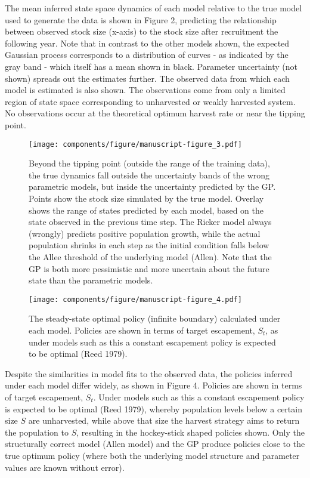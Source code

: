 \documentclass[author-year, 12pt,review]{elsarticle} %
\makeatletter
\def\maxwidth{\ifdim\Gin@nat@width>\linewidth\linewidth
\else\Gin@nat@width\fi}
\let\Oldincludegraphics\includegraphics
\renewcommand{\includegraphics}[1]{\Oldincludegraphics[width=\maxwidth]{#1}}
\makeatother
\begin{document}
The mean inferred state space dynamics of each model relative to the
true model used to generate the data is shown in Figure 2, predicting
the relationship between observed stock size (x-axis) to the stock size
after recruitment the following year. Note that in contrast to the other
models shown, the expected Gaussian process corresponds to a
distribution of curves - as indicated by the gray band - which itself
has a mean shown in black. Parameter uncertainty (not shown) spreads out
the estimates further. The observed data from which each model is
estimated is also shown. The observations come from only a limited
region of state space corresponding to unharvested or weakly harvested
system. No observations occur at the theoretical optimum harvest rate or
near the tipping point.

\begin{figure}[htbp]
\centering
\texttt{[image: components/figure/manuscript-figure\_3.pdf]}
\caption{Beyond the tipping point (outside the range of the training
data), the true dynamics fall outside the uncertainty bands of the wrong
parametric models, but inside the uncertainty predicted by the GP.
Points show the stock size simulated by the true model. Overlay shows
the range of states predicted by each model, based on the state observed
in the previous time step. The Ricker model always (wrongly) predicts
positive population growth, while the actual population shrinks in each
step as the initial condition falls below the Allee threshold of the
underlying model (Allen). Note that the GP is both more pessimistic and
more uncertain about the future state than the parametric models.}
\end{figure}

\begin{figure}[htbp]
\centering
\texttt{[image: components/figure/manuscript-figure\_4.pdf]}
\caption{The steady-state optimal policy (infinite boundary) calculated
under each model. Policies are shown in terms of target escapement,
$S_t$, as under models such as this a constant escapement policy is
expected to be optimal (Reed 1979).}
\end{figure}

Despite the similarities in model fits to the observed data, the
policies inferred under each model differ widely, as shown in Figure 4.
Policies are shown in terms of target escapement, $S_t$. Under models
such as this a constant escapement policy is expected to be optimal
(Reed 1979), whereby population levels below a certain size $S$ are
unharvested, while above that size the harvest strategy aims to return
the population to $S$, resulting in the hockey-stick shaped policies
shown. Only the structurally correct model (Allen model) and the GP
produce policies close to the true optimum policy (where both the
underlying model structure and parameter values are known without
error).
\end{document}
